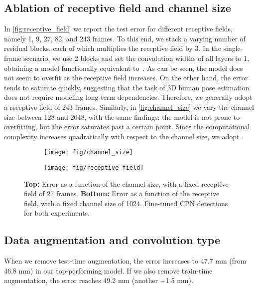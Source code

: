 \documentclass[10pt,twocolumn,letterpaper]{article}
\begin{document}
\subsection{Ablation of receptive field and channel size}
\label{sec:receptive_channel}

In \autoref{fig:receptive_field} we report the test error for different receptive fields, namely 1, 9, 27, 82, and 243 frames. 
To this end, we stack a varying number of residual blocks, each of which multiplies the receptive field by 3.
In the single-frame scenario, we use 2 blocks and set the convolution widths of all layers to 1, obtaining a model functionally equivalent to~\cite{martinez:simple:2017}. 
As can be seen, the model does not seem to overfit as the receptive field increases. 
On the other hand, the error tends to saturate quickly, suggesting that the task of 3D human pose estimation does not require modeling long-term dependencies. 
Therefore, we generally adopt a receptive field of 243 frames. 
Similarly, in \autoref{fig:channel_size} we vary the channel size between 128 and 2048, with the same findings: the model is not prone to overfitting, but the error saturates past a certain point. 
Since the computational complexity increases quadratically with respect to the channel size, we adopt .

\begin{figure}
    \centering
        \begin{subfigure}{\linewidth}
        \centering
        \texttt{[image: fig/channel\_size]}
        \caption{}
	    \label{fig:channel_size}
    \end{subfigure}\quad
    \begin{subfigure}{\linewidth}
        \centering
        \texttt{[image: fig/receptive\_field]}
        \caption{}
	    \label{fig:receptive_field}
    \end{subfigure}
	\caption{
		\textbf{Top:} Error as a function of the channel size, with a fixed receptive field of 27 frames.
		\textbf{Bottom:} Error as a function of the receptive field, with a fixed channel size of 1024. 
		Fine-tuned CPN detections for both experiments.
	}
\end{figure}


\subsection{Data augmentation and convolution type}
\label{app:data_conv}

When we remove test-time augmentation, the error increases to 47.7 mm (from 46.8 mm) in our top-performing model. 
If we also remove train-time augmentation, the error reaches 49.2 mm (another +1.5 mm).
\end{document}
